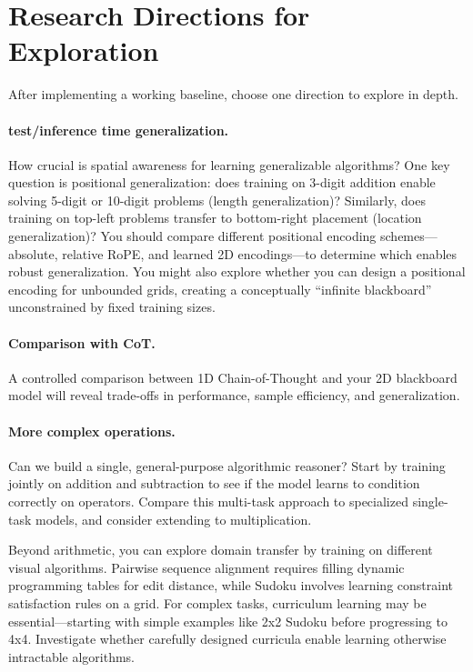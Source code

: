\documentclass[11pt, a4paper]{article}
\begin{document}
\section{Research Directions for Exploration}

After implementing a working baseline, choose one direction to explore in depth.

\paragraph{test/inference time generalization.} How crucial is spatial awareness for learning generalizable algorithms? One key question is positional generalization: does training on 3-digit addition enable solving 5-digit or 10-digit problems (length generalization)? Similarly, does training on top-left problems transfer to bottom-right placement (location generalization)? You should compare different positional encoding schemes—absolute, relative RoPE, and learned 2D encodings—to determine which enables robust generalization. You might also explore whether you can design a positional encoding for unbounded grids, creating a conceptually ``infinite blackboard'' unconstrained by fixed training sizes.

\paragraph{Comparison with CoT.}
A controlled comparison between 1D Chain-of-Thought and your 2D blackboard model will reveal trade-offs in performance, sample efficiency, and generalization.

\paragraph{More complex  operations.}
Can we build a single, general-purpose algorithmic reasoner? Start by training jointly on addition and subtraction to see if the model learns to condition correctly on operators. Compare this multi-task approach to specialized single-task models, and consider extending to multiplication.

Beyond arithmetic, you can explore domain transfer by training on different visual algorithms. Pairwise sequence alignment requires filling dynamic programming tables for edit distance, while Sudoku involves learning constraint satisfaction rules on a grid. For complex tasks, curriculum learning may be essential—starting with simple examples like 2x2 Sudoku before progressing to 4x4. Investigate whether carefully designed curricula enable learning otherwise intractable algorithms.
\end{document}
